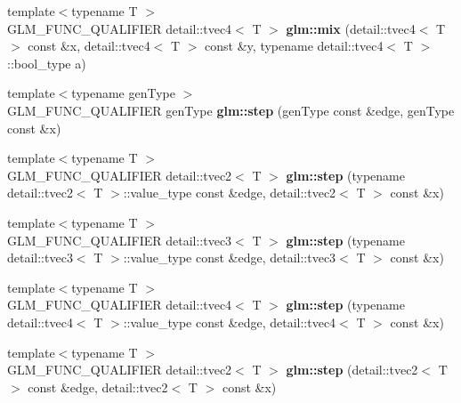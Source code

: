 \begin{DoxyCompactItemize}
\item 
\hypertarget{namespaceglm_ac37856ea533b4d5b40cf13fd1656f81a}{{\footnotesize template$<$typename T $>$ }\\\-G\-L\-M\-\_\-\-F\-U\-N\-C\-\_\-\-Q\-U\-A\-L\-I\-F\-I\-E\-R \*
detail\-::tvec4$<$ \-T $>$ {\bfseries glm\-::mix} (detail\-::tvec4$<$ \-T $>$ const \&x, detail\-::tvec4$<$ \-T $>$ const \&y, typename detail\-::tvec4$<$ \-T $>$\-::bool\-\_\-type a)}\label{namespaceglm_ac37856ea533b4d5b40cf13fd1656f81a}

\item 
\hypertarget{namespaceglm_a6119820dd92ad61a0795d308707d9d49}{{\footnotesize template$<$typename gen\-Type $>$ }\\\-G\-L\-M\-\_\-\-F\-U\-N\-C\-\_\-\-Q\-U\-A\-L\-I\-F\-I\-E\-R gen\-Type {\bfseries glm\-::step} (gen\-Type const \&edge, gen\-Type const \&x)}\label{namespaceglm_a6119820dd92ad61a0795d308707d9d49}

\item 
\hypertarget{namespaceglm_ad31450d9914d789050de9d03963ff6dd}{{\footnotesize template$<$typename T $>$ }\\\-G\-L\-M\-\_\-\-F\-U\-N\-C\-\_\-\-Q\-U\-A\-L\-I\-F\-I\-E\-R \*
detail\-::tvec2$<$ \-T $>$ {\bfseries glm\-::step} (typename detail\-::tvec2$<$ \-T $>$\-::value\-\_\-type const \&edge, detail\-::tvec2$<$ \-T $>$ const \&x)}\label{namespaceglm_ad31450d9914d789050de9d03963ff6dd}

\item 
\hypertarget{namespaceglm_abb223e75ad40dd1097f8b96162d128b4}{{\footnotesize template$<$typename T $>$ }\\\-G\-L\-M\-\_\-\-F\-U\-N\-C\-\_\-\-Q\-U\-A\-L\-I\-F\-I\-E\-R \*
detail\-::tvec3$<$ \-T $>$ {\bfseries glm\-::step} (typename detail\-::tvec3$<$ \-T $>$\-::value\-\_\-type const \&edge, detail\-::tvec3$<$ \-T $>$ const \&x)}\label{namespaceglm_abb223e75ad40dd1097f8b96162d128b4}

\item 
\hypertarget{namespaceglm_a5b8d769e10531d75d560d533c4a2e9d2}{{\footnotesize template$<$typename T $>$ }\\\-G\-L\-M\-\_\-\-F\-U\-N\-C\-\_\-\-Q\-U\-A\-L\-I\-F\-I\-E\-R \*
detail\-::tvec4$<$ \-T $>$ {\bfseries glm\-::step} (typename detail\-::tvec4$<$ \-T $>$\-::value\-\_\-type const \&edge, detail\-::tvec4$<$ \-T $>$ const \&x)}\label{namespaceglm_a5b8d769e10531d75d560d533c4a2e9d2}

\item 
\hypertarget{namespaceglm_ada537586e2c341cbdd3e4a213b03a2da}{{\footnotesize template$<$typename T $>$ }\\\-G\-L\-M\-\_\-\-F\-U\-N\-C\-\_\-\-Q\-U\-A\-L\-I\-F\-I\-E\-R \*
detail\-::tvec2$<$ \-T $>$ {\bfseries glm\-::step} (detail\-::tvec2$<$ \-T $>$ const \&edge, detail\-::tvec2$<$ \-T $>$ const \&x)}\label{namespaceglm_ada537586e2c341cbdd3e4a213b03a2da}


\end{DoxyCompactItemize}
